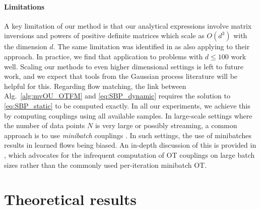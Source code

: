 \documentclass{article}
\theoremstyle{newstyle}
\begin{document}
\paragraph{Limitations} A key limitation of our method is that our analytical expressions involve matrix inversions and powers of positive definite matrices which scale as $O(d^3)$ with the dimension $d$. The same limitation was identified in \cite{bunne2023schrodinger} as also applying to their approach. In practice, we find that application to problems with $d \leq 100$ work well. Scaling our methods to even higher dimensional settings is left to future work, and we expect that tools from the Gaussian process literature will be helpful for this. Regarding flow matching, the link between Alg.~\ref{alg:mvOU_OTFM} and \eqref{eq:SBP_dynamic} requires the solution to \eqref{eq:SBP_static} to be computed exactly. In all our experiments, we achieve this by computing couplings using all available samples. In large-scale settings where the number of data points $N$ is very large or possibly streaming, a common approach is to use \emph{minibatch} couplings \cite{tong2023improving}. In such settings, the use of minibatches results in learned flows being biased. An in-depth discussion of this is provided in \cite{klein2025fitting}, which advocates for the infrequent computation of OT couplings on large batch sizes rather than the commonly used per-iteration minibatch OT.  

\newpage 





\appendix

\newpage

\section{Theoretical results}\label{sec:theoretical_results}
\end{document}
